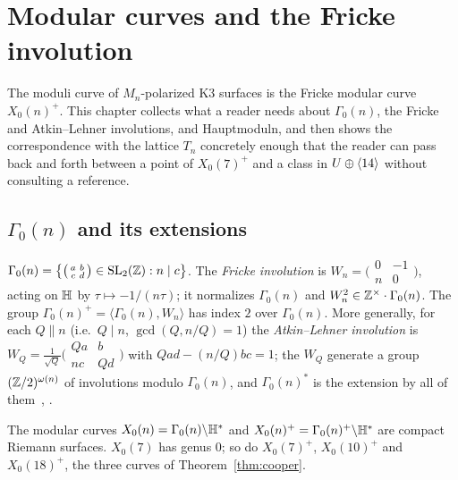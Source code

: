 \chapter{Modular curves and the Fricke involution}\label{ch:modular}

The moduli curve of $M_n$-polarized K3 surfaces is the Fricke modular curve
$X_0(n)^+$. This chapter collects what a reader needs about $\Gamma_0(n)$, the
Fricke and Atkin--Lehner involutions, and Hauptmoduln, and then shows the
correspondence with the lattice $T_n$ concretely enough that the reader can
pass back and forth between a point of $X_0(7)^+$ and a class in $U\oplus\langle 14\rangle$
without consulting a reference.

\section{$\Gamma_0(n)$ and its extensions}

\begin{definition}
$\Gamma_0(n)=\bigl\{\bigl(\begin{smallmatrix}a&b\\c&d\end{smallmatrix}\bigr)\in\operatorname{SL}_2(\mathbb{Z}):
n\mid c\bigr\}$. The \emph{Fricke involution} is $W_n=\bigl(\begin{smallmatrix}0&-1\\n&0\end{smallmatrix}\bigr)$,
acting on $\mathbb{H}$ by $\tau\mapsto-1/(n\tau)$; it normalizes $\Gamma_0(n)$ and
$W_n^2\in\mathbb{Z}^\times\cdot\Gamma_0(n)$. The group $\Gamma_0(n)^+=\langle\Gamma_0(n),W_n\rangle$
has index $2$ over $\Gamma_0(n)$. More generally, for each $Q\parallel n$ (i.e.\
$Q\mid n$, $\gcd(Q,n/Q)=1$) the \emph{Atkin--Lehner involution} is
$W_Q=\tfrac1{\sqrt Q}\bigl(\begin{smallmatrix}Qa&b\\nc&Qd\end{smallmatrix}\bigr)$
with $Qad-(n/Q)bc=1$; the $W_Q$ generate a group $(\mathbb{Z}/2)^{\omega(n)}$ of
involutions modulo $\Gamma_0(n)$, and $\Gamma_0(n)^*$ is the extension by all of
them~\cite[\S5]{AtkinLehner1970}, \cite[Ch.~3]{DiamondShurman2005}.
\end{definition}

The modular curves $X_0(n)=\Gamma_0(n)\backslash\mathbb{H}^*$ and
$X_0(n)^+=\Gamma_0(n)^+\backslash\mathbb{H}^*$ are compact Riemann surfaces. $X_0(7)$
has genus $0$; so do $X_0(7)^+$, $X_0(10)^+$ and $X_0(18)^+$, the three
curves of Theorem~\ref{thm:cooper}.


